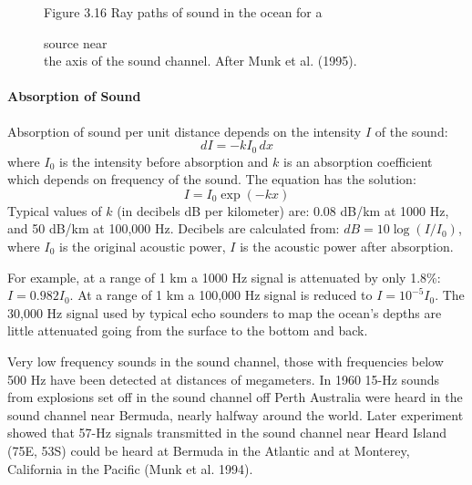 \begin{figure}[t!]
\footnotesize
\centering
Figure 3.16 Ray paths of sound in the ocean for a
\rule{0pt}{3ex}source near\\the axis of the sound channel. After Munk
et al. (1995).

\label{fig:raypaths}
\vspace{-3ex}
\end{figure}

\paragraph{Absorption of Sound}
Absorption of sound per unit distance
depends on the intensity $I$ of the sound:
\begin{equation}
dI = -k I_0 \, dx
\end{equation}
where $I_0$ is the intensity before absorption and $k$ is an
absorption coefficient which depends on frequency of the sound. The
equation has the solution:
\begin{equation}
I = I_0 \exp(-kx)
\end{equation}
Typical values of $k$ (in decibels dB per kilometer) are: 0.08 dB/km
at 1000 Hz, and 50 dB/km at 100,000 Hz. Decibels are calculated from:
$dB = 10 \log(I/I_0)$, where $I_0$ is the original acoustic power, $I$
is the acoustic power after absorption.

For example, at a range of 1 km a 1000 Hz signal is attenuated by only
1.8\%: $I = 0.982 I_0$. At a range of 1 km a 100,000 Hz signal is
reduced to $I = 10^{-5} I_0$. The 30,000 Hz signal used by typical
echo sounders to map the ocean's depths are little attenuated going
from the surface to the bottom and back.

Very low frequency sounds in the sound channel,
those with frequencies below 500 Hz have been detected at distances of
megameters. In 1960 15-Hz sounds from explosions set off in the sound
channel off Perth Australia were heard in the
sound channel near Bermuda, nearly halfway around the world. Later
experiment showed that 57-Hz signals transmitted in the sound channel
near Heard Island (75\degrees E, 53\degrees S) could be heard at
Bermuda in the Atlantic and at Monterey, California in the Pacific
(Munk et al. 1994).

